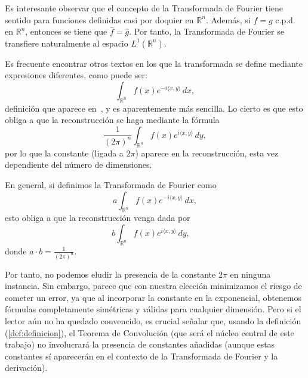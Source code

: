 \begin{observacion}
Es interesante observar que el concepto de la Transformada de Fourier tiene sentido para funciones definidas casi por doquier en $\mathbb{R}^n$.
Además, si $f=g$ c.p.d. en $\mathbb{R}^n$, entonces se tiene que $\widehat{f}=\widehat{g}$. Por tanto, la Transformada de Fourier se transfiere naturalmente al espacio $L^1(\mathbb{R}^n)$.

\end{observacion}

\begin{observacion}
Es frecuente encontrar otros textos en los que la transformada se define mediante expresiones diferentes, como puede ser:
\begin{equation}\label{eq:trans2}
    \int_{\mathbb{R}^n} f(x) e^{-i \langle x, y \rangle} \, dx,
\end{equation}
definición que aparece en~\cite{FourierTransformsClassic}, y es aparentemente más sencilla. Lo cierto es que esto obliga a que la reconstrucción se haga mediante la fórmula 
\begin{equation}
   \frac{1}{(2 \pi)^n} \int_{\mathbb{R}^n} f(x) e^{i \langle x, y \rangle} \, dy ,
\end{equation}
por lo que la constante (ligada  a $2 \pi$) aparece en la reconstrucción, esta vez dependiente del número de dimensiones.

\noindent En general, si definimos la Transformada de Fourier como 
\begin{equation}
    a\int_{\mathbb{R}^n} f(x) e^{-i \langle x, y \rangle} \, dx ,
\end{equation}
esto obliga a que la reconstrucción venga dada por 
\begin{equation}
   b\int_{\mathbb{R}^n} f(x) e^{i \langle x, y \rangle} \, dy, \quad 
\end{equation}
donde $a \cdot b = \frac{1}{(2\pi)^n}$.

\noindent Por tanto, no podemos eludir la presencia de la constante $2 \pi$ en ninguna instancia. Sin embargo, parece que con nuestra elección minimizamos el riesgo de cometer un error, ya que al incorporar la constante en la exponencial, obtenemos fórmulas completamente simétricas y válidas para cualquier dimensión. Pero si el lector aún no ha quedado convencido, es crucial señalar que, usando la definición (\ref{def:definicion}), el Teorema de Convolución (que será el núcleo central de este trabajo) no involucrará la presencia de constantes añadidas (aunque estas constantes sí aparecerán en el contexto de la Transformada  de Fourier y la derivación).
\end{observacion}

